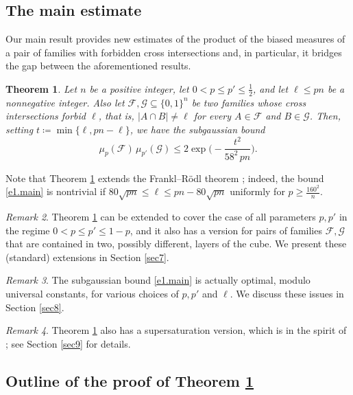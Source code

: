 \documentclass[10pt,a4paper]{amsart}
\newtheorem{thm}{Theorem}[section]
\theoremstyle{remark}
\newtheorem{rem}[thm]{Remark}
\newcommand{\meg}{\geqslant}
\newcommand{\mik}{\leqslant}
\newcommand{\Fcal}{\mathcal{F}}
\newcommand{\Gcal}{\mathcal{G}}
\begin{document}
\subsection{The main estimate} \label{subsec1.2}

Our main result provides new estimates of the product of the biased measures of a pair of families
with forbidden cross intersections and, in particular, it bridges the gap between the aforementioned results.
\begin{thm} \label{main}
Let $n$ be a positive integer, let $0<p\mik p'\mik \frac12$, and let $\ell\mik pn$ be a nonnegative integer.
Also let $\Fcal,\Gcal\subseteq \{0,1\}^n$ be two families whose cross intersections forbid $\ell$, that is,
$|A\cap B|\neq \ell$ for every $A\in\Fcal$ and $B\in\Gcal$. Then, setting $t\coloneqq \min\{\ell,pn-\ell\}$,
we have the subgaussian bound
\begin{equation} \label{e1.main}
\mu_p(\Fcal)\, \mu_{p'}(\Gcal) \mik 2\exp\Big( - \frac{t^2}{58^2\, pn}\Big).
\end{equation}
\end{thm}
Note that Theorem \ref{main} extends the Frankl--R\"{o}dl theorem \cite[Theorem 1.5]{FR87};
indeed, the bound \eqref{e1.main} is nontrivial if $80\sqrt{pn}\mik \ell \mik pn-80\sqrt{pn}$
uniformly for $p\meg \frac{160^2}{n}$.
\begin{rem} \label{r1.2}
Theorem \ref{main} can be extended to cover the case of all parameters $p,p'$ in the regime
$0<p\mik p'\mik 1-p$, and it also has a version for pairs of families $\Fcal,\Gcal$ that are contained
in two, possibly different, layers of the cube. We present these (standard) extensions in Section \ref{sec7}.
\end{rem}
\begin{rem} \label{r1.3}
The subgaussian bound \eqref{e1.main} is actually optimal, modulo universal constants,
for various choices of $p,p'$ and $\ell$. We discuss these issues in Section \ref{sec8}.
\end{rem}
\begin{rem} \label{r1.4}
Theorem \ref{main} also has a supersaturation version, which is in the spirit of
\cite[Theorem 1.14]{FR87}; see Section \ref{sec9} for details.
\end{rem}

\subsection{Outline of the proof of Theorem \ref{main}} \label{subsec1.3}
\end{document}
